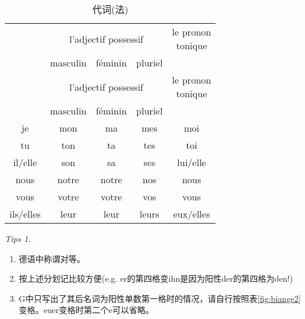 \documentclass[12pt,A4paper,oneside,reqno]{amsart}
\numberwithin{equation}{section}
\theoremstyle{plain}
\theoremstyle{plain}
\theoremstyle{plain}
\numberwithin{equation}{section}
\theoremstyle{remark}
\newtheorem{tips}[theorem]{Tips}
\begin{document}
	\begin{longtable}{c|c|c|c|c}
	\hline
&	\multicolumn{3}{c|}{l'adjectif possessif}					&	\multirowcell{2}{le pronon\\ tonique}	\\
\cline{2-4} 									
&	masculin	&	f\'{e}minin	&	pluriel	&		\\
	\hline
	\endhead
	\hline
&	\multicolumn{3}{c|}{l'adjectif possessif}					&	\multirowcell{2}{le pronon\\ tonique}	\\
\cline{2-4} 									
&	masculin	&	f\'{e}minin	&	pluriel	&		\\
	\hline
	\endfirsthead	
	\hline
	\endfoot
	\hline		
	\caption{代词(法)}
	\endlastfoot																	
je	&	mon	&	ma	&	mes	&	moi	\\
tu	&	ton	&	ta	&	tes	&	toi	\\
il/elle	&	son	&	sa	&	ses	&	lui/elle	\\
nous	&	notre	&	notre	&	nos	&	nous	\\
vous	&	votre	&	votre	&	vos	&	vous	\\
ils/elles	&	leur	&	leur	&	leurs	&	eux/elles	\\



		\hline
\end{longtable}	

\begin{tips}\
	\begin{enumerate}
		\item 德语中称谓对等。
		\item 按上述分划记比较方便(e.g. er的第四格变ihn是因为阳性der的第四格为den!)
		\item G中只写出了其后名词为阳性单数第一格时的情况，请自行按照表\ref{fig:biange2}变格。euer变格时第二个e可以省略。
	\end{enumerate}
\end{tips}
\end{document}
